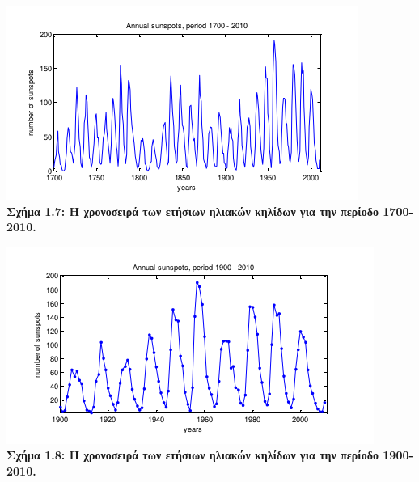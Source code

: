 \begin{center}
\includegraphics[scale=0.7]{graf5_7.png}\\
\textbf{ Σχήμα 1.7: Η χρονοσειρά των ετήσιων ηλιακών κηλίδων για την περίοδο 1700-2010.}
\end{center}
\begin{center}
\includegraphics[scale=0.7]{graf5_8.png}\\
\textbf{Σχήμα 1.8: Η χρονοσειρά των ετήσιων ηλιακών κηλίδων για την περίοδο 1900-2010. }
\end{center}
